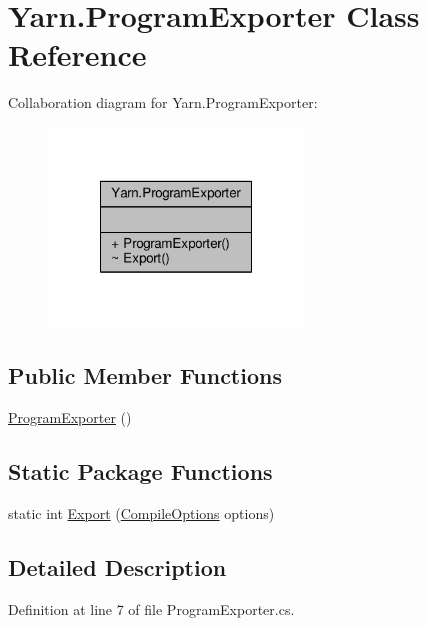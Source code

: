\hypertarget{a00143}{\section{Yarn.\-Program\-Exporter Class Reference}
\label{a00143}
}


Collaboration diagram for Yarn.\-Program\-Exporter\-:
\nopagebreak
\begin{figure}[H]
\begin{center}
\leavevmode
\includegraphics[width=192pt]{a00743}
\end{center}
\end{figure}
\subsection*{Public Member Functions}
\begin{DoxyCompactItemize}
\item 
\hyperlink{a00143_a2e617f0d69a4a6a1c5307af390067079}{Program\-Exporter} ()
\end{DoxyCompactItemize}
\subsection*{Static Package Functions}
\begin{DoxyCompactItemize}
\item 
static int \hyperlink{a00143_a3679a1f144471ea411fed34f6a79a18d}{Export} (\hyperlink{a00045}{Compile\-Options} options)
\end{DoxyCompactItemize}


\subsection{Detailed Description}


Definition at line 7 of file Program\-Exporter.\-cs.




